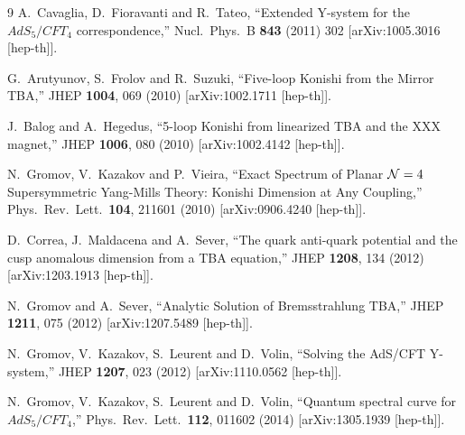 \documentclass[a4paper]{article}
\numberwithin{equation}{section}
\begin{document}
\begin{thebibliography} {9}
  A.~Cavaglia, D.~Fioravanti and R.~Tateo,
  ``Extended Y-system for the $AdS_5/CFT_4$ correspondence,''
  Nucl.\ Phys.\ B {\bf 843} (2011) 302
  [arXiv:1005.3016 [hep-th]].
  
  G.~Arutyunov, S.~Frolov and R.~Suzuki,
  ``Five-loop Konishi from the Mirror TBA,''
  JHEP {\bf 1004}, 069 (2010)
  [arXiv:1002.1711 [hep-th]].
  
  J.~Balog and A.~Hegedus,
  ``5-loop Konishi from linearized TBA and the XXX magnet,''
  JHEP {\bf 1006}, 080 (2010)
  [arXiv:1002.4142 [hep-th]].

  N.~Gromov, V.~Kazakov and P.~Vieira,
  ``Exact Spectrum of Planar ${\cal N}=4$ Supersymmetric Yang-Mills Theory: Konishi Dimension at Any Coupling,''
  Phys.\ Rev.\ Lett.\  {\bf 104}, 211601 (2010)
  [arXiv:0906.4240 [hep-th]].
  
  D.~Correa, J.~Maldacena and A.~Sever,
  ``The quark anti-quark potential and the cusp anomalous dimension from a TBA equation,''
  JHEP {\bf 1208}, 134 (2012)
  [arXiv:1203.1913 [hep-th]].
  
  N.~Gromov and A.~Sever,
  ``Analytic Solution of Bremsstrahlung TBA,''
  JHEP {\bf 1211}, 075 (2012)
  [arXiv:1207.5489 [hep-th]].
  
  N.~Gromov, V.~Kazakov, S.~Leurent and D.~Volin,
  ``Solving the AdS/CFT Y-system,''
  JHEP {\bf 1207}, 023 (2012)
  [arXiv:1110.0562 [hep-th]].
  
  N.~Gromov, V.~Kazakov, S.~Leurent and D.~Volin,
  ``Quantum spectral curve for $AdS_5/CFT_4$,''
  Phys.\ Rev.\ Lett.\  {\bf 112}, 011602 (2014)
  [arXiv:1305.1939 [hep-th]].
  

\end{thebibliography}
\end{document}
